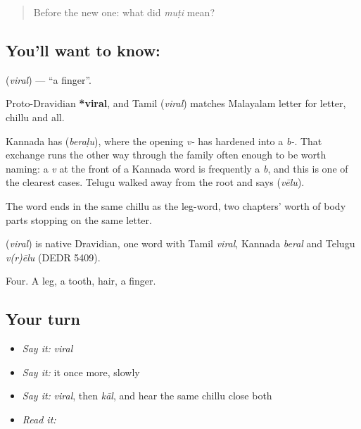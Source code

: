 \label{lesson:ML-C47-finger}



\begin{quote}
Before the new one: what did \emph{muṭi} mean?
\end{quote}

\subsection*{You'll want to know: }
\textbf{} (\emph{viral}) — \textquotedblleft{}a finger\textquotedblright{}.

Proto-Dravidian \textbf{*viral}, and Tamil  (\emph{viral}) matches Malayalam letter for letter, chillu and all.

Kannada has  (\emph{beraḷu}), where the opening \emph{v-} has hardened into a \emph{b-}. That exchange runs the other way through the family often enough to be worth naming: a \emph{v} at the front of a Kannada word is frequently a \emph{b}, and this is one of the clearest cases. Telugu walked away from the root and says  (\emph{vēlu}).

The word ends in the same chillu  as the leg-word, two chapters' worth of body parts stopping on the same letter.

\begin{cousinweb}
\textbf{} (\emph{viral}) is native Dravidian, one word with Tamil \emph{viral}, Kannada \emph{beral} and Telugu \emph{v(r)ēlu} (DEDR 5409).
\end{cousinweb}

\begin{grammarlens}[title={What you've built}]
Four. A leg, a tooth, hair, a finger.
\end{grammarlens}

\subsection*{Your turn}
\begin{itemize}
\raggedright
  \item \emph{Say it:} \emph{viral}
  \item \emph{Say it:} it once more, slowly
  \item \emph{Say it:} \emph{viral}, then \emph{kāl}, and hear the same chillu close both
  \item \emph{Read it:} \textbf{}
\end{itemize}

